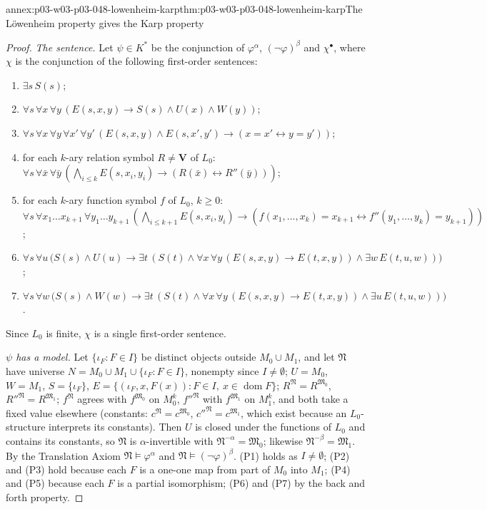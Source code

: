 \begin{annexitem}{annex:p03-w03-p03-048-lowenheim-karp}{thm:p03-w03-p03-048-lowenheim-karp}{The L\"owenheim property gives the Karp property}
\begin{proof}
\emph{The sentence.}  Let \(\psi\in K^{\ast}\) be the conjunction of
\(\varphi^{\alpha}\), \((\neg\varphi)^{\beta}\) and \(\chi^{\bullet}\), where
\(\chi\) is the conjunction of the following first-order sentences:
\begin{enumerate}
\item[(P1)] \(\exists s\,S(s)\);
\item[(P2)] \(\forall s\,\forall x\,\forall y\,(E(s,x,y)\to S(s)\land U(x)\land
      W(y))\);
\item[(P3)] \(\forall s\,\forall x\,\forall y\,\forall x'\,\forall y'\,
      (E(s,x,y)\land E(s,x',y')\to(x=x'\leftrightarrow y=y'))\);
\item[(P4)] for each \(k\)-ary relation symbol \(R\neq\mathbf V\) of \(L_0\):
      \(\forall s\,\forall\bar x\,\forall\bar y\,(\bigwedge_{i\leq k}E(s,x_i,y_i)
      \to(R(\bar x)\leftrightarrow R''(\bar y)))\);
\item[(P5)] for each \(k\)-ary function symbol \(f\) of \(L_0\), \(k\geq0\):
      \(\forall s\,\forall x_1\ldots x_{k+1}\,\forall y_1\ldots y_{k+1}\,
      (\bigwedge_{i\leq k+1}E(s,x_i,y_i)\to(f(x_1,\ldots,x_k)=x_{k+1}
      \leftrightarrow f''(y_1,\ldots,y_k)=y_{k+1}))\);
\item[(P6)] \(\forall s\,\forall u\,\bigl(S(s)\land U(u)\to\exists t\,(S(t)\land
      \forall x\,\forall y\,(E(s,x,y)\to E(t,x,y))\land\exists w\,E(t,u,w))\bigr)\);
\item[(P7)] \(\forall s\,\forall w\,\bigl(S(s)\land W(w)\to\exists t\,(S(t)\land
      \forall x\,\forall y\,(E(s,x,y)\to E(t,x,y))\land\exists u\,E(t,u,w))\bigr)\).
\end{enumerate}
Since \(L_0\) is finite, \(\chi\) is a single first-order sentence.

\emph{\(\psi\) has a model.}  Let \(\{\iota_F:F\in I\}\) be distinct objects
outside \(M_0\cup M_1\), and let \(\mathfrak N\) have universe
\(N=M_0\cup M_1\cup\{\iota_F:F\in I\}\), nonempty since \(I\neq\emptyset\);
\(U=M_0\), \(W=M_1\), \(S=\{\iota_F\}\), \(E=\{(\iota_F,x,F(x)):F\in I,\
x\in\operatorname{dom}F\}\); \(R^{\mathfrak N}=R^{\mathfrak M_0}\),
\(R''^{\mathfrak N}=R^{\mathfrak M_1}\); \(f^{\mathfrak N}\) agrees with
\(f^{\mathfrak M_0}\) on \(M_0^{k}\), \(f''^{\mathfrak N}\) with
\(f^{\mathfrak M_1}\) on \(M_1^{k}\), and both take a fixed value elsewhere
(constants: \(c^{\mathfrak N}=c^{\mathfrak M_0}\),
\(c''^{\mathfrak N}=c^{\mathfrak M_1}\), which exist because an
\(L_0\)-structure interprets its constants).  Then \(U\) is closed under the
functions of \(L_0\) and contains its constants, so \(\mathfrak N\) is
\(\alpha\)-invertible with \(\mathfrak N^{-\alpha}=\mathfrak M_0\);
likewise \(\mathfrak N^{-\beta}=\mathfrak M_1\).  By the Translation Axiom
\(\mathfrak N\models\varphi^{\alpha}\) and
\(\mathfrak N\models(\neg\varphi)^{\beta}\).  (P1) holds as
\(I\neq\emptyset\); (P2) and (P3) hold because each \(F\) is a one-one map
from part of \(M_0\) into \(M_1\); (P4) and (P5) because each \(F\) is a
partial isomorphism; (P6) and (P7) by the back and forth property.


\end{proof}
\end{annexitem}
